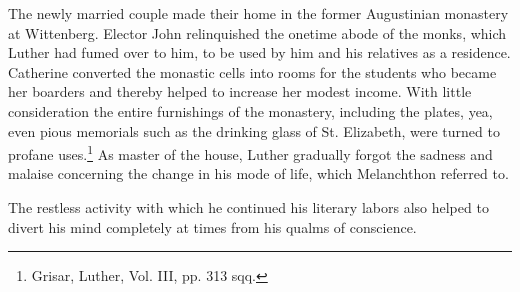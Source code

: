 The newly married couple made their home in the former Augustinian
monastery at Wittenberg. Elector John relinquished the onetime abode of
the monks, which Luther had fumed over to him,
to be used by him and his relatives as a residence. Catherine converted
the monastic cells into rooms for the students who became
her boarders and thereby helped to increase her modest income.
With little consideration the entire furnishings of the monastery,
including the plates, yea, even pious memorials such as the drinking
glass of St. Elizabeth, were turned to profane uses.\footnote
{Grisar, Luther, Vol. III, pp. 313 sqq.}
As master of
the house, Luther gradually forgot the sadness and malaise concerning
the change in his mode of life, which Melanchthon referred to.

The restless activity with which he continued his literary labors
also helped to divert his mind completely at times from his qualms
of conscience.
